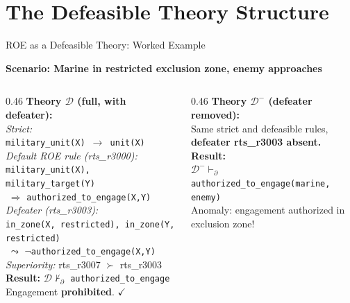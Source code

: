 \documentclass[aspectratio=169, 10pt]{beamer}
\newcommand{\D}{\mathcal{D}}
\newcommand{\roecheck}{\textcolor{ROEGreen}{$\checkmark$}}
\begin{document}
\section{The Defeasible Theory Structure}

\begin{frame}{ROE as a Defeasible Theory: Worked Example}

  \textbf{Scenario: Marine in restricted exclusion zone, enemy approaches}

  \vspace{0.5em}
  \begin{columns}[T]
    \begin{column}{0.46\textwidth}
      \textbf{Theory $\D$ (full, with defeater):}\\[0.3em]
      \small
      \textit{Strict:}\\
      \texttt{military\_unit(X) $\to$ unit(X)}\\[2pt]
      \textit{Default ROE rule (rts\_r3000):}\\
      \texttt{military\_unit(X), military\_target(Y)}\\
      $\;\Rightarrow$ \texttt{authorized\_to\_engage(X,Y)}\\[2pt]
      \textit{Defeater (rts\_r3003):}\\
      \texttt{in\_zone(X, restricted), in\_zone(Y, restricted)}\\
      $\;\leadsto$ $\neg$\texttt{authorized\_to\_engage(X,Y)}\\[2pt]
      \textit{Superiority:} rts\_r3007 $\succ$ rts\_r3003\\[4pt]
      \textbf{Result:} $\D \not\vdash_\partial$ \texttt{authorized\_to\_engage}\\
      Engagement \textbf{prohibited}. \roecheck
    \end{column}

    \begin{column}{0.46\textwidth}
      \textbf{Theory $\D^-$ (defeater removed):}\\[0.3em]
      \small
      Same strict and defeasible rules,\\
      \textbf{defeater rts\_r3003 absent.}\\[0.5em]
      \textbf{Result:}\\
      $\D^- \vdash_\partial$ \texttt{authorized\_to\_engage(marine, enemy)}\\[0.3em]
      \alert{Anomaly}: engagement authorized in exclusion zone!\\[0.6em]


\end{column}
\end{columns}
\end{frame}
\end{document}
